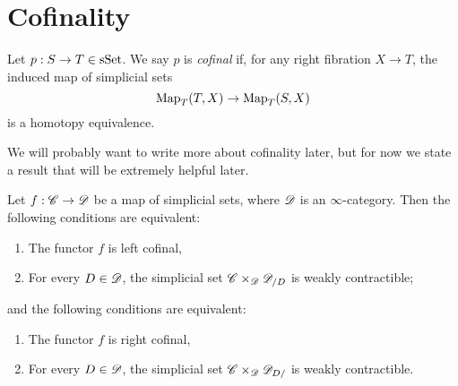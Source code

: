 \documentclass[../../thesis.tex]{subfiles}
\begin{document}
\section{Cofinality}
\begin{definition}{\cite[Definition 4.1.1.1]{HTT}}
    Let \(p:S\to T \in \mathrm{sSet} \). We say $p$ is \emph{cofinal} if, for any right fibration $X\to T$, the induced map of simplicial sets
    \[
        \mathrm{Map}_T(T,X) \to \mathrm{Map}_T(S,X)
    \]
    is a homotopy equivalence.
\end{definition}
We will probably want to write more about cofinality later, but for now we state a result that will be extremely helpful later.
\begin{theorem}{\cite[\href{https://kerodon.net/tag/02NY}{Theorem 02NY}]{kerodon}\label{superlemma}}
    Let \(f: \mathscr{C} \to \mathscr{D}\) be a map of simplicial sets, where $\mathscr{D}$ is an $\infty$-category.
    Then the following conditions are equivalent:
    \begin{enumerate}
        \item The functor $f$ is left cofinal,
        \item For every $D\in \mathscr{D}$, the simplicial set $\mathscr{C}\times_{\mathscr{D}} \mathscr{D}_{/D}$ is weakly contractible;
    \end{enumerate}
    and the following conditions are equivalent:
    \begin{enumerate}
        \item The functor $f$ is right cofinal,
        \item For every $D\in \mathscr{D}$, the simplicial set $\mathscr{C}\times_{\mathscr{D}} \mathscr{D}_{D/}$ is weakly contractible.
    \end{enumerate}
\end{theorem}
\end{document}
